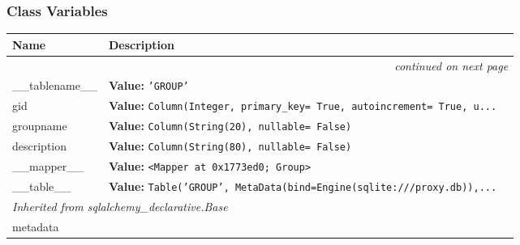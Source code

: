 
  \subsubsection{Class Variables}

    \vspace{-1cm}
\hspace{\varindent}\begin{longtable}{|p{\varnamewidth}|p{\vardescrwidth}|l}
\cline{1-2}
\cline{1-2} \centering \textbf{Name} & \centering \textbf{Description}& \\
\cline{1-2}
\endhead\cline{1-2}\multicolumn{3}{r}{\small\textit{continued on next page}}\\\endfoot\cline{1-2}
\endlastfoot\raggedright \_\-\_\-t\-a\-b\-l\-e\-n\-a\-m\-e\-\_\-\_\- & \raggedright \textbf{Value:} 
{\tt \texttt{'}\texttt{GROUP}\texttt{'}}&\\
\cline{1-2}
\raggedright g\-i\-d\- & \raggedright \textbf{Value:} 
{\tt Column(Integer, primary\_key= True, autoincrement= True, u\texttt{...}}&\\
\cline{1-2}
\raggedright g\-r\-o\-u\-p\-n\-a\-m\-e\- & \raggedright \textbf{Value:} 
{\tt Column(String(20), nullable= False)}&\\
\cline{1-2}
\raggedright d\-e\-s\-c\-r\-i\-p\-t\-i\-o\-n\- & \raggedright \textbf{Value:} 
{\tt Column(String(80), nullable= False)}&\\
\cline{1-2}
\raggedright \_\-\_\-m\-a\-p\-p\-e\-r\-\_\-\_\- & \raggedright \textbf{Value:} 
{\tt {\textless}Mapper at 0x1773ed0; Group{\textgreater}}&\\
\cline{1-2}
\raggedright \_\-\_\-t\-a\-b\-l\-e\-\_\-\_\- & \raggedright \textbf{Value:} 
{\tt Table('GROUP', MetaData(bind=Engine(sqlite:///proxy.db)),\texttt{...}}&\\
\cline{1-2}
\multicolumn{2}{|l|}{\textit{Inherited from sqlalchemy\_declarative.Base}}\\
\multicolumn{2}{|p{\varwidth}|}{\raggedright metadata}\\
\cline{1-2}
\end{longtable}

